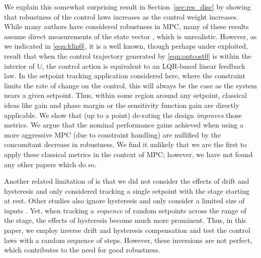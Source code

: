 \documentclass[twocolumn,twoside]{IEEEtran}
\begin{document}

We explain this somewhat surprising result in Section~\ref{sec:res_disc} by showing that robustness of the control laws increases as the control weight increases.
While many authors have considered robustness in MPC, many of these results assume direct measurements of the state vector \cite{santos_tool_2004, rodrigues_uncertainty_2003, kothare_robust_1996}, which is unrealistic. However, as we indicated in \eqref{eqn:klin0}, it is a well known, though perhaps under exploited, result that when the control trajectory generated by \eqref{eqn:optcost0} is within the interior of $\mathds{U}$, the control action is equivalent to an LQR-based linear feedback law. 
In the setpoint tracking application considered here, where the constraint limits the rate of change on the control, this will always be the case as the system nears a given setpoint. Thus, within some region around any setpoint, classical ideas like gain and phase margin or the sensitivity function gain are directly applicable.
We show that (up to a point) de-rating the design \emph{improves} those metrics. We argue that the nominal performance gains achieved when using a more aggressive MPC (due to constraint handling) are nullified by the concomitant decrease in robustness. We find it unlikely that we are the first to apply these classical metrics in the context of MPC; however, we have not found any other papers which do so.

Another related limitation of \cite{braker_application_2017} is that we did not consider the effects of drift and hysteresis and only considered tracking a single setpoint with the stage starting at rest. Other studies also ignore hysteresis and only consider a limited size of inputs \cite{Lin_ASME_2012,Wills_CDC_2005}. Yet, when tracking a \emph{sequence} of random setpoints across the range of the stage, the effects of hysteresis become much more prominent. Thus, in this paper, we employ inverse drift and hysteresis compensation and test the control laws with a random sequence of steps. However, these inversions are not perfect, which contributes to the need for good robustness.
\end{document}
